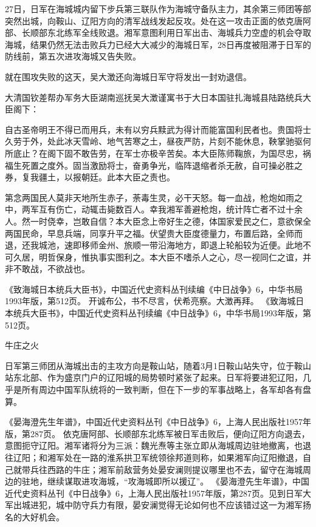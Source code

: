 \documentclass[12pt,UTF8]{ctexbook}
\begin{document}
27日，日军在海城城内留下步兵第三联队作为海城守备队主力，其余第三师团等部突然出城，向鞍山、辽阳方向的清军战线发起反攻。处在这一攻击正面的依克唐阿部、长顺部东北练军全线败退。湘军意图利用日军出击、海城兵力空虚的机会夺取海城，结果仍然无法击败兵力已经大大减少的海城日军，28日再度被阻滞于日军的防线前，第五次进攻海城又告失败。

就在围攻失败的这天，吴大澂还向海城日军守将发出一封劝退信。

大清国钦差帮办军务大臣湖南巡抚吴大澂谨寓书于大日本国驻扎海城县陆路统兵大臣阁下：

自古圣帝明王不得已而用兵，未有以穷兵黩武为得计而能富国利民者也。贵国将士久劳于外，处此冰天雪岭、地气苦寒之土，昼夜严防，片刻不能休息，鞅掌驰驱何所底止？在阁下固不敢告劳，在军士亦极辛苦矣。本大臣陈师鞠旅，为国尽忠，祸福生死置之度外。固当激励将士，奋勇争光，临阵退缩者杀无赦，自可操必胜之券，复我疆土，以报朝廷。此本大臣之责也。

第念两国民人莫非天地所生赤子，荼毒生灵，必干天怒。每一血战，枪炮如雨之中，两军互有伤亡，动辄击毙数百人。幸我湘军善避枪炮，统计阵亡者不过十余人。然一时侥幸，岂敢自信？本大臣念上帝好生之德，体国家爱民之仁，意欲保全两国民命，早息兵端，同享升平之福。伏望贵大臣度德量力，布置后路，全师而退，还我城池，速即移师金州、旅顺一带沿海地方，即退上轮船较为近便。此地不可久居，明哲保身，惟执事实图利之。本大臣不嗜杀人之心，尽一视同仁之谊，并非不敢战，不欲战也。

《致海城日本统兵大臣书》，中国近代史资料丛刊续编《中日战争》6，中华书局1993年版，第512页。
开诚布公，书不尽言，伏希亮察。大澂再拜。 《致海城日本统兵大臣书》，中国近代史资料丛刊续编《中日战争》6，中华书局1993年版，第512页。

牛庄之火

日军第三师团从海城出击的主攻方向是鞍山站，随着3月1日鞍山站失守，位于鞍山站东北部、作为盛京门户的辽阳城的局势顿时紧张了起来。日军将要进犯辽阳，几乎是所有周边中国军队统将的一致判断，但在下一步的军事战略上，各军却各有盘算。

《晏海澄先生年谱》，中国近代史资料丛刊《中日战争》6，上海人民出版社1957年版，第287页。
依克唐阿部、长顺部东北练军被日军击败后，便向辽阳方向退去，意图扼守辽阳。湘军诸将分为三派：魏光焘等主张立即从海城周边驻地撤离，也退往辽阳；和湘军处在一路的淮系拱卫军统领徐邦道则称，如果湘军向辽阳撤退，自己就带兵往西路的牛庄；湘军前敌营务处晏安澜则提议哪里也不去，留守在海城周边的驻地，继续谋取进攻海城，“攻海城即所以援辽”。 《晏海澄先生年谱》，中国近代史资料丛刊《中日战争》6，上海人民出版社1957年版，第287页。见到日军大军出城进犯，城中防守兵力有限，晏安澜觉得无论如何也不应该错过这一为湘军扬名的大好机会。
\end{document}
